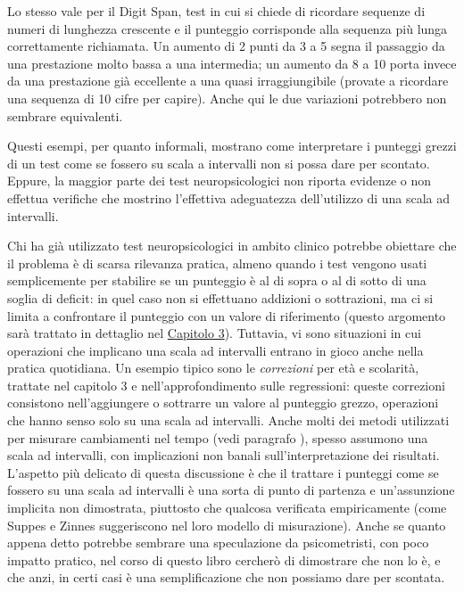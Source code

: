 \documentclass[
  italian,
  letterpaper,
  paper=A4,
  headinclude=on,
  footinclude=on,
  12pt]{scrbook}
\begin{document}
Lo stesso vale per il Digit Span, test in cui si chiede di ricordare
sequenze di numeri di lunghezza crescente e il punteggio corrisponde
alla sequenza più lunga correttamente richiamata. Un aumento di 2 punti
da 3 a 5 segna il passaggio da una prestazione molto bassa a una
intermedia; un aumento da 8 a 10 porta invece da una prestazione già
eccellente a una quasi irraggiungibile (provate a ricordare una sequenza
di 10 cifre per capire). Anche qui le due variazioni potrebbero non
sembrare equivalenti.

Questi esempi, per quanto informali, mostrano come interpretare i
punteggi grezzi di un test come se fossero su scala a intervalli non si
possa dare per scontato. Eppure, la maggior parte dei test
neuropsicologici non riporta evidenze o non effettua verifiche che
mostrino l'effettiva adeguatezza dell'utilizzo di una scala ad
intervalli.

Chi ha già utilizzato test neuropsicologici in ambito clinico potrebbe
obiettare che il problema è di scarsa rilevanza pratica, almeno quando i
test vengono usati semplicemente per stabilire se un punteggio è al di
sopra o al di sotto di una soglia di deficit: in quel caso non si
effettuano addizioni o sottrazioni, ma ci si limita a confrontare il
punteggio con un valore di riferimento (questo argomento sarà trattato
in dettaglio nel \hyperref[Capitolo3]{Capitolo 3}). Tuttavia, vi sono
situazioni in cui operazioni che implicano una scala ad intervalli
entrano in gioco anche nella pratica quotidiana. Un esempio tipico sono
le \emph{correzioni} per età e scolarità, trattate nel capitolo 3 e
nell'approfondimento sulle regressioni: queste correzioni consistono
nell'aggiungere o sottrarre un valore al punteggio grezzo, operazioni
che hanno senso solo su una scala ad intervalli. Anche molti dei metodi
utilizzati per misurare cambiamenti nel tempo (vedi paragrafo ), spesso
assumono una scala ad intervalli, con implicazioni non banali
sull'interpretazione dei risultati. L'aspetto più delicato di questa
discussione è che il trattare i punteggi come se fossero su una scala ad
intervalli è una sorta di punto di partenza e un'assunzione implicita
non dimostrata, piuttosto che qualcosa verificata empiricamente (come
Suppes e Zinnes suggeriscono nel loro modello di misurazione). Anche se
quanto appena detto potrebbe sembrare una speculazione da psicometristi,
con poco impatto pratico, nel corso di questo libro cercherò di
dimostrare che non lo è, e che anzi, in certi casi è una semplificazione
che non possiamo dare per scontata.
\end{document}
